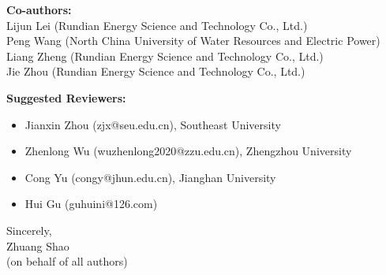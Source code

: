 \documentclass[11pt]{article}
\begin{document}
\vspace{0.3cm}

\noindent
\textbf{Co-authors:}\\
Lijun Lei (Rundian Energy Science and Technology Co., Ltd.)\\
Peng Wang (North China University of Water Resources and Electric Power)\\
Liang Zheng (Rundian Energy Science and Technology Co., Ltd.)\\
Jie Zhou (Rundian Energy Science and Technology Co., Ltd.)

\vspace{0.3cm}

\noindent
\textbf{Suggested Reviewers:}
\begin{itemize}
\item Jianxin Zhou (zjx@seu.edu.cn), Southeast University
\item Zhenlong Wu (wuzhenlong2020@zzu.edu.cn), Zhengzhou University
\item Cong Yu (congy@jhun.edu.cn), Jianghan University
\item Hui Gu (guhuini@126.com)
\end{itemize}

\vspace{0.5cm}

\noindent
Sincerely,\\[0.3cm]
Zhuang Shao\\
(on behalf of all authors)
\end{document}

